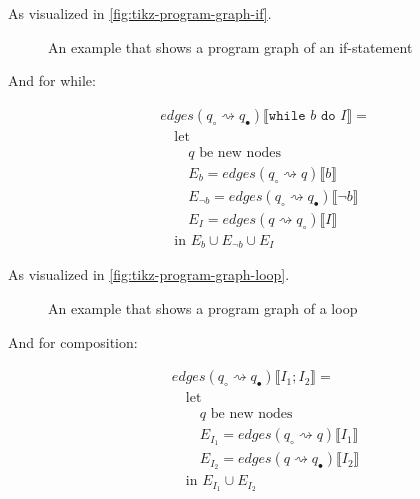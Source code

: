 As visualized in \autoref{fig:tikz-program-graph-if}.

\begin{figure}[htb!]
    \center
    
    \caption{An example that shows a program graph of an if-statement}
    \label{fig:tikz-program-graph-if}
\end{figure}

And for while:

\begin{equation}
    \begin{split}
        &edges(q_\circ \rightsquigarrow q_\bullet) \llbracket \texttt{while } b \texttt{ do } I \rrbracket = \\
        &\quad \text{let } \\
        &\quad\quad q \text{ be new nodes} \\
        &\quad\quad E_{b} = edges(q_\circ \rightsquigarrow q) \llbracket b \rrbracket \\
        &\quad\quad E_{\neg b} = edges(q_\circ \rightsquigarrow q_\bullet) \llbracket \neg b \rrbracket \\
        &\quad\quad E_{I} = edges(q \rightsquigarrow q_\circ) \llbracket I \rrbracket \\
        &\quad \text{in } E_{b} \cup E_{\neg b} \cup E_{I}
    \end{split}\label{eq:equation9}
\end{equation}

As visualized in \autoref{fig:tikz-program-graph-loop}.

\begin{figure}[htb!]
    \center
    
    \caption{An example that shows a program graph of a loop}
    \label{fig:tikz-program-graph-loop}
\end{figure}

And for composition:

\begin{equation}
    \begin{split}
        &edges(q_\circ \rightsquigarrow q_\bullet) \llbracket I_1; I_2 \rrbracket = \\
        &\quad \text{let } \\
        &\quad\quad q \text{ be new nodes} \\
        &\quad\quad E_{I_1} = edges(q_\circ \rightsquigarrow q) \llbracket I_1 \rrbracket \\
        &\quad\quad E_{I_2} = edges(q \rightsquigarrow q_\bullet) \llbracket I_2 \rrbracket \\
        &\quad \text{in } E_{I_1} \cup E_{I_2}
    \end{split}\label{eq:equation10}
\end{equation}

